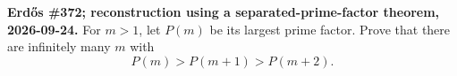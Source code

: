 \textbf{Erd\H{o}s \#372; reconstruction using a separated-prime-factor theorem, 2026-09-24.}
For $m>1$, let $P(m)$ be its largest prime factor. Prove that there are infinitely many $m$ with
\[
P(m)>P(m+1)>P(m+2).
\]
